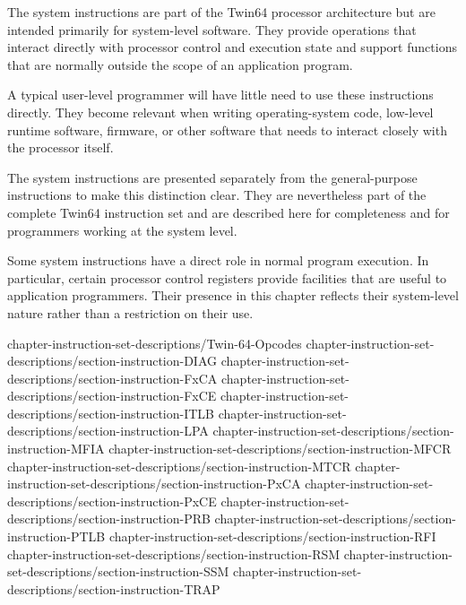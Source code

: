 %
%

The system instructions are part of the Twin64 processor architecture but are intended primarily for system-level software. They provide operations that interact directly with processor control and execution state and support functions that are normally outside the scope of an application program.

A typical user-level programmer will have little need to use these instructions directly. They become relevant when writing operating-system code, low-level runtime software, firmware, or other software that needs to interact closely with the processor itself.

The system instructions are presented separately from the general-purpose instructions to make this distinction clear. They are nevertheless part of the complete Twin64 instruction set and are described here for completeness and for programmers working at the system level.

Some system instructions have a direct role in normal program execution. In particular, certain processor control registers provide facilities that are useful to application programmers. Their presence in this chapter reflects their system-level nature rather than a restriction on their use.

%
%
 {chapter-instruction-set-descriptions/Twin-64-Opcodes}
 {chapter-instruction-set-descriptions/section-instruction-DIAG}
 {chapter-instruction-set-descriptions/section-instruction-FxCA}
 {chapter-instruction-set-descriptions/section-instruction-FxCE}
 {chapter-instruction-set-descriptions/section-instruction-ITLB}
 {chapter-instruction-set-descriptions/section-instruction-LPA}
 {chapter-instruction-set-descriptions/section-instruction-MFIA}
 {chapter-instruction-set-descriptions/section-instruction-MFCR}
 {chapter-instruction-set-descriptions/section-instruction-MTCR}
 {chapter-instruction-set-descriptions/section-instruction-PxCA}
 {chapter-instruction-set-descriptions/section-instruction-PxCE}
 {chapter-instruction-set-descriptions/section-instruction-PRB}
 {chapter-instruction-set-descriptions/section-instruction-PTLB}
 {chapter-instruction-set-descriptions/section-instruction-RFI}
 {chapter-instruction-set-descriptions/section-instruction-RSM}
 {chapter-instruction-set-descriptions/section-instruction-SSM}
 {chapter-instruction-set-descriptions/section-instruction-TRAP}
